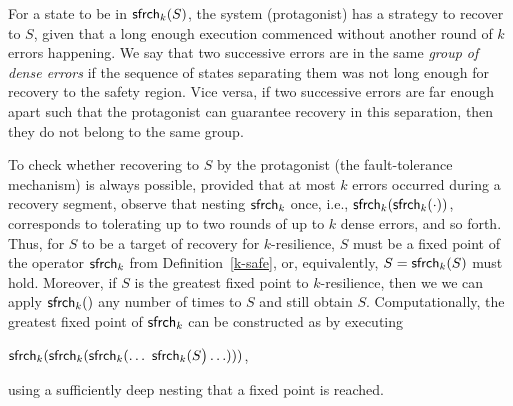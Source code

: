 
For a state to be in $\mathsf{sfrch}_k(S)$, 
the system (protagonist) has a strategy to recover to $S$, 
given that a long enough execution commenced 
without another round of $k$ errors happening.
We say that two successive errors are in the same 
\emph{group of dense errors} 
if the sequence of states separating them 
was not long enough for recovery to the safety region.
Vice versa, if two successive errors are far enough apart 
such that the protagonist can guarantee recovery in this separation, 
then they do not belong to the same group.
% 

To check whether recovering to $S$ by the protagonist (the fault-tolerance mechanism)
is always possible, provided that at most $k$ errors occurred during 
a recovery segment, observe that nesting 
$\mathsf{sfrch}_k$ once, i.e., $\mathsf{sfrch}_k(\mathsf{sfrch}_k(\cdot))$, corresponds
to tolerating up to two rounds of up to $k$ dense errors, and so forth.
Thus, for $S$ to be a target of recovery for $k$-resilience, 
$S$ must be a fixed point of the operator
$\mathsf{sfrch}_k$ from Definition~\ref{k-safe}, or, equivalently, 
$S=\mathsf{sfrch}_k(S)$ must hold.  
Moreover, if $S$ is the greatest fixed point to $k$-resilience, then we we can apply 
$\mathsf{sfrch}_k()$ any number of times to $S$ and still obtain $S$.  
Computationally, the greatest fixed point of $\mathsf{sfrch}_k$ can be constructed as 
by executing  
\begin{center} 
$\safe_k(\safe_k(\safe_k(\ldots\ \safe_k(S\big)\ldots)))$,
\end{center}  
using a sufficiently deep nesting that a fixed point is reached.

